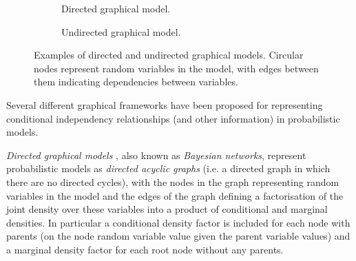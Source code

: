 \begin{figure}[!t]
\centering
\begin{subfigure}[b]{.5\linewidth}
\vskip 0pt
\centering
{}
\caption{Directed graphical model.}
\label{sfig:example-directed-graphical-model}
\end{subfigure}%
\begin{subfigure}[b]{.5\linewidth}
\vskip 0pt
\centering
{}
\caption{Undirected graphical model.}
\label{sfig:example-undirected-graphical-model}
\end{subfigure}%
\caption[Directed and undirected graphical models.]{Examples of directed and undirected graphical models. Circular nodes represent random variables in the model, with edges between them indicating dependencies between variables.}%
\label{fig:example-graphical-models}
\end{figure}

Several different graphical frameworks have been proposed for representing conditional independency relationships (and other information) in probabilistic models. 

\emph{Directed graphical models} \citep{pearl1988probabilistic}, also known as \emph{Bayesian networks}, represent probabilistic models as \emph{directed acyclic graphs} (i.e. a directed graph in which there are no directed cycles), with the nodes in the graph representing random variables in the model and the edges of the graph defining a factorisation of the joint density over these variables into a product of conditional and marginal densities. In particular a conditional density factor is included for each node with parents (on the node random variable value given the parent variable values) and a marginal density factor for each root node without any parents.

